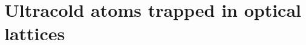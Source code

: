 %
%
\chapter{Ultracold atoms trapped in optical lattices}
\label{ch:ultracold_atoms_trapped_in_optical_lattices}
